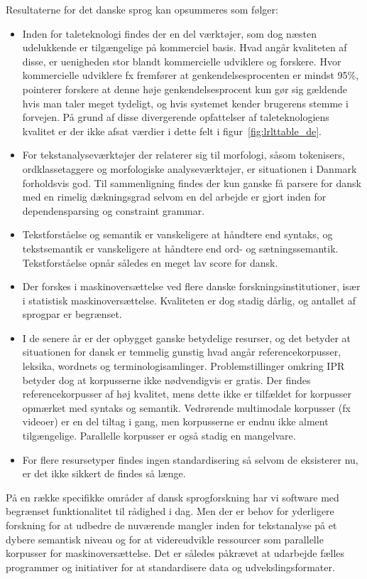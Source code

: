 \begin{multicols}{2}
Resultaterne for det danske sprog kan opsummeres som f\o lger:
 \begin{itemize}
      \item Inden for taleteknologi findes der en del v\ae rkt\o jer, som dog n\ae sten udelukkende er tilg\ae ngelige \mbox{p\aa} kommerciel basis. Hvad ang\aa r kvaliteten af disse, er uenigheden stor blandt kommercielle udviklere og forskere. Hvor kommercielle udviklere fx fremf\o rer at genkendelsesprocenten er mindst 95\%, pointerer forskere at denne h\o je genkendelsesprocent kun g\o r sig g\ae ldende hvis man taler meget tydeligt, og hvis systemet kender brugerens stemme i forvejen. \mbox{P\aa} grund af disse divergerende opfattelser af taleteknologiens kvalitet er der ikke afsat v\ae rdier i dette felt i figur~\ref{fig:lrlttable_de}.
\item For tekstanalysev\ae rkt\o jer der relaterer sig til morfologi, \mbox{s\aa}som tokenisers, ordklassetaggere og morfologiske analysev\ae rkt\o jer, er situationen i Danmark forholdsvis god. Til sammenligning findes der kun ganske \mbox{f\aa} parsere for dansk med en rimelig d\ae kningsgrad selvom en del arbejde er gjort inden for dependensparsing og constraint grammar.
\item \sloppy Tekstforst\aa else og semantik er vanskeligere at h\aa ndtere end syntaks, og tekstsemantik er vanskeligere at h\aa ndtere end ord- og s\ae tningssemantik. Tekstforst\aa else opn\aa r s\aa ledes en meget lav score for dansk. 
\item Der forskes i maskinovers\ae ttelse ved flere danske forskningsinstitutioner, is\ae r i statistisk maskinovers\ae ttelse. Kvaliteten er dog stadig d\aa rlig, og antallet af sprogpar er begr\ae nset. 
\item I de senere \aa r er der opbygget ganske betydelige resurser, og det betyder at situationen for dansk er temmelig gunstig hvad ang\aa r referencekorpusser, leksika, wordnets og terminologisamlinger. Problemstillinger omkring IPR betyder dog at korpusserne ikke n\o dvendigvis er gratis. Der findes referencekorpusser af h\o j kvalitet, mens dette ikke er tilf\ae ldet for korpusser opm\ae rket med syntaks og semantik. Vedr\o rende multimodale korpusser (fx videoer) er en del tiltag i gang, men korpusserne er endnu ikke alment tilg\ae ngelige. Parallelle korpusser er \mbox{ogs\aa} stadig en mangelvare. 
\item For flere resursetyper findes ingen standardisering \mbox{s\aa} selvom de eksisterer nu, er det ikke sikkert de findes \mbox{s\aa} l\ae nge.
\end{itemize}
\mbox{P\aa}  en r\ae kke specifikke omr\aa der af dansk sprogforskning har vi software med begr\ae nset funktionalitet til r\aa dighed i dag. Men der er behov for yderligere forskning for at udbedre de nuv\ae rende  mangler inden for tekstanalyse \mbox{p\aa} et dybere semantisk niveau og for at videreudvikle ressourcer som parallelle korpusser for maskinoversættelse.
Det er s\aa ledes p\aa kr\ae vet at udarbejde f\ae lles programmer og initiativer for at standardisere data og udvekslingsformater. 


\end{multicols}
